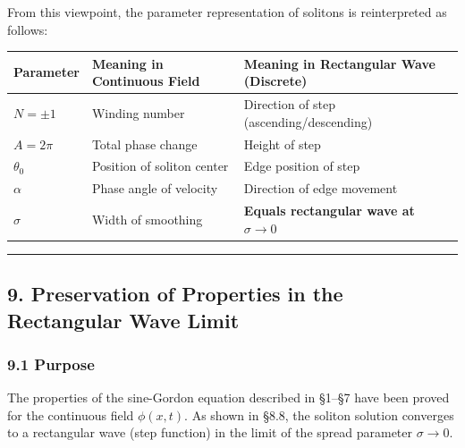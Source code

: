 \documentclass[a4paper,11pt]{article}
\newcounter{none}
\begin{document}
From this viewpoint, the parameter representation of solitons is
reinterpreted as follows:

{\def\LTcaptype{none} %
\begin{longtable}[]{@{}
  >{\centering\arraybackslash}p{}
  >{\centering\arraybackslash}p{}
  >{\centering\arraybackslash}p{}@{}}
\toprule\noalign{}
\begin{minipage}[b]{\linewidth}\centering
Parameter
\end{minipage} & \begin{minipage}[b]{\linewidth}\centering
Meaning in Continuous Field
\end{minipage} & \begin{minipage}[b]{\linewidth}\centering
Meaning in Rectangular Wave (Discrete)
\end{minipage} \\
\midrule\noalign{}
\endhead
\bottomrule\noalign{}
\endlastfoot
\(N = \pm 1\) & Winding number & Direction of step
(ascending/descending) \\
\(A = 2\pi\) & Total phase change & Height of step \\
\(\theta_0\) & Position of soliton center & Edge position of step \\
\(\alpha\) & Phase angle of velocity & Direction of edge movement \\
\(\sigma\) & Width of smoothing & \textbf{Equals rectangular wave at
\(\sigma \to 0\)} \\
\end{longtable}
}

\begin{center}\rule{0.5\linewidth}{0.5pt}\end{center}

\subsection{9. Preservation of Properties in the Rectangular Wave
Limit}\label{preservation-of-properties-in-the-rectangular-wave-limit}

\subsubsection{9.1 Purpose}\label{purpose}

The properties of the sine-Gordon equation described in §1--§7 have been
proved for the continuous field \(\phi(x, t)\). As shown in §8.8, the
soliton solution converges to a rectangular wave (step function) in the
limit of the spread parameter \(\sigma \to 0\).
\end{document}
